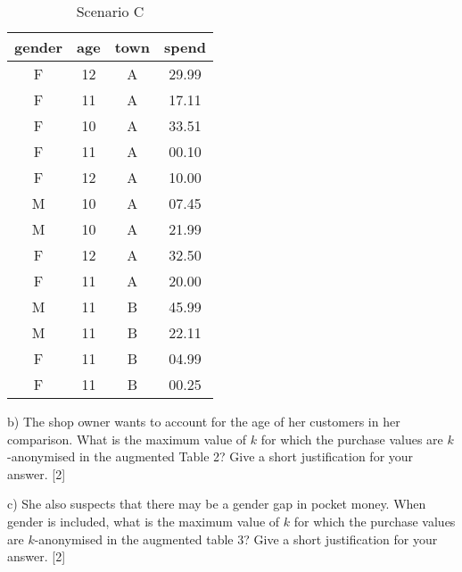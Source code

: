 \documentclass[a4paper, 11pt]{article}
\begin{document}
\begin{table}[hbtp]
    \begin{minipage}{0.45\textwidth}   
    \centering 
    \begin{tabular}{ccc|c}
        gender & age & town & spend \\
        \hline
        F      & 12  & A    & 29.99 \\
        F      & 11  & A    & 17.11 \\
        F      & 10  & A    & 33.51 \\
        F      & 11  & A    & 00.10 \\
        F      & 12  & A    & 10.00 \\
        M      & 10  & A    & 07.45 \\
        M      & 10  & A    & 21.99 \\
        F      & 12  & A    & 32.50 \\
        F      & 11  & A    & 20.00 \\
        M      & 11  & B    & 45.99 \\
        M      & 11  & B    & 22.11 \\
        F      & 11  & B    & 04.99 \\
        F      & 11  & B    & 00.25 \\
    \end{tabular}
    \caption{Scenario C}
    \end{minipage}
    
    \label{tab:my_label}
\end{table}

b) The shop owner wants to account for the age of her customers in her comparison. What is the maximum value of $k$ for which the purchase values are $k$-anonymised in the augmented Table 2? Give a short justification for your answer. [2]


c) She also suspects that there may be a gender gap in pocket money. When gender is included, what is the maximum value of $k$ for which the purchase values are $k$-anonymised in the augmented table 3? Give a short justification for your answer. [2]

 
\end{document}
